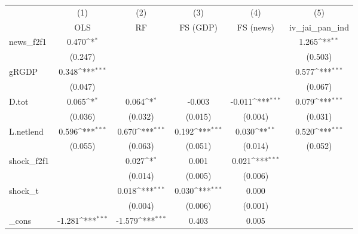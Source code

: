 {
\def\sym#1{\ifmmode^{#1}\else\(^{#1}\)\fi}
\begin{tabular}{l*{5}{c}}
\toprule
            &\multicolumn{1}{c}{(1)}&\multicolumn{1}{c}{(2)}&\multicolumn{1}{c}{(3)}&\multicolumn{1}{c}{(4)}&\multicolumn{1}{c}{(5)}\\
            &\multicolumn{1}{c}{OLS}&\multicolumn{1}{c}{RF}&\multicolumn{1}{c}{FS (GDP)}&\multicolumn{1}{c}{FS (news)}&\multicolumn{1}{c}{iv\_jai\_pan\_ind}\\
\midrule
news\_f2f1   &       0.470\sym{*}  &                     &                     &                     &       1.265\sym{**} \\
            &     (0.247)         &                     &                     &                     &     (0.503)         \\
\addlinespace
gRGDP       &       0.348\sym{***}&                     &                     &                     &       0.577\sym{***}\\
            &     (0.047)         &                     &                     &                     &     (0.067)         \\
\addlinespace
D.tot       &       0.065\sym{*}  &       0.064\sym{*}  &      -0.003         &      -0.011\sym{***}&       0.079\sym{***}\\
            &     (0.036)         &     (0.032)         &     (0.015)         &     (0.004)         &     (0.031)         \\
\addlinespace
L.netlend   &       0.596\sym{***}&       0.670\sym{***}&       0.192\sym{***}&       0.030\sym{**} &       0.520\sym{***}\\
            &     (0.055)         &     (0.063)         &     (0.051)         &     (0.014)         &     (0.052)         \\
\addlinespace
shock\_f2f1  &                     &       0.027\sym{*}  &       0.001         &       0.021\sym{***}&                     \\
            &                     &     (0.014)         &     (0.005)         &     (0.006)         &                     \\
\addlinespace
shock\_t     &                     &       0.018\sym{***}&       0.030\sym{***}&       0.000         &                     \\
            &                     &     (0.004)         &     (0.006)         &     (0.001)         &                     \\
\addlinespace
\_cons      &      -1.281\sym{***}&      -1.579\sym{***}&       0.403         &       0.005         &                     \\

\end{tabular}}
